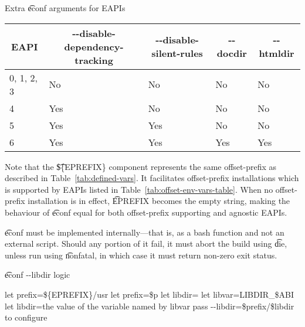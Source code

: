 \begin{description}
    \begin{centertable}{Extra \t{econf} arguments for EAPIs}
        \label{tab:econf-options-table}
        \begin{tabular}{lllll}
          \toprule
          \multicolumn{1}{c}{\textbf{EAPI}} &
          \multicolumn{1}{c}{\textbf{-{}-disable-dependency-tracking}} &
          \multicolumn{1}{c}{\textbf{-{}-disable-silent-rules}} &
          \multicolumn{1}{c}{\textbf{-{}-docdir}} &
          \multicolumn{1}{c}{\textbf{-{}-htmldir}} \\
          \midrule
          0, 1, 2, 3        & No  & No  & No  & No  \\
          4                 & Yes & No  & No  & No  \\
          5                 & Yes & Yes & No  & No  \\
          6                 & Yes & Yes & Yes & Yes \\
          \bottomrule
        \end{tabular}
    \end{centertable}

    Note that the \t{\$\{EPREFIX\}} component represents the same offset-prefix as described in
    Table~\ref{tab:defined-vars}. It facilitates offset-prefix installations which is supported by
    EAPIs listed in Table~\ref{tab:offset-env-vars-table}. When no offset-prefix installation is in
    effect, \t{EPREFIX} becomes the empty string, making the behaviour of \t{econf} equal for both
    offset-prefix supporting and agnostic EAPIs.

    \t{econf} must be implemented internally---that is, as a bash function and not an external
    script. Should any portion of it fail, it must abort the build using \t{die}, unless run using
    \t{nonfatal}, in which case it must return non-zero exit status.

\begin{algorithm}
\caption{\t{econf -{}-libdir} logic} \label{alg:econf-libdir}
\begin{algorithmic}[1]
\STATE let prefix=\$\{EPREFIX\}/usr
    \STATE let prefix=\$p
\ENDIF
\STATE let libdir=
    \STATE let libvar=LIBDIR_\$ABI
        \STATE let libdir=the value of the variable named by libvar
    \ENDIF
\ENDIF
{}
    \STATE pass -{}-libdir=\$prefix/\$libdir to configure
\ENDIF
\end{algorithmic}
\end{algorithm}


\end{description}
